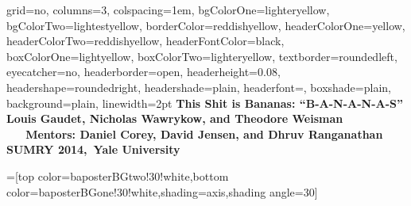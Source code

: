 \documentclass[landscape,final,columns=3]{baposter}
\begin{document}
\begin{poster}{
  grid=no,
  columns=3,
   colspacing=1em,
  bgColorOne=lighteryellow, %
  bgColorTwo=lightestyellow, %
  borderColor=reddishyellow,
  headerColorOne=yellow,
  headerColorTwo=reddishyellow,
  headerFontColor=black,
  boxColorOne=lightyellow,
  boxColorTwo=lighteryellow,
  textborder=roundedleft,
  eyecatcher=no,
  headerborder=open,
  headerheight=0.08\textheight,
  headershape=roundedright,
  headershade=plain,
  headerfont=\Large\textsf, %
  boxshade=plain,
  background=plain,
  linewidth=2pt
  }
  {
  }
{\bf{\textcolor{mit}{This Shit is Bananas: ``B-A-N-A-N-A-S''}} %
{\rm \\ \large  Louis Gaudet, Nicholas Wawrykow, and Theodore Weisman \ \ \
 \textbf{Mentors:} Daniel Corey, David Jensen, and Dhruv Ranganathan \\
 SUMRY 2014,\ Yale University
  }}


  =[top color=baposterBGtwo!30!white,bottom color=baposterBGone!30!white,shading=axis,shading angle=30]
     \newlength{\leftimgwidth}
     \setlength{\leftimgwidth}{0.78em+8.0em}


\end{poster}
\end{document}
